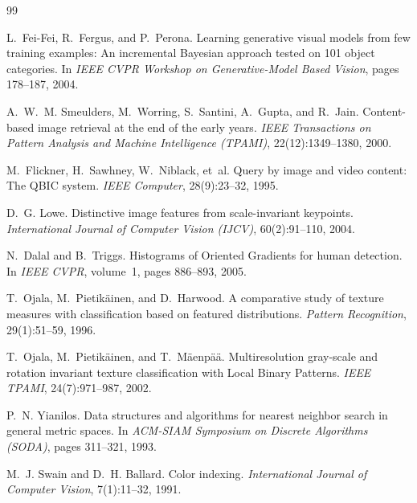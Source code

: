 \documentclass[11pt,a4paper,oneside]{report}
\theoremstyle{definition}
\begin{document}
\newpage
\begin{thebibliography}{99}

L.~Fei-Fei, R.~Fergus, and P.~Perona.
\newblock Learning generative visual models from few training examples: An incremental Bayesian approach tested on 101 object categories.
\newblock In \emph{IEEE CVPR Workshop on Generative-Model Based Vision}, pages 178--187, 2004.

A.~W.~M. Smeulders, M.~Worring, S.~Santini, A.~Gupta, and R.~Jain.
\newblock Content-based image retrieval at the end of the early years.
\newblock \emph{IEEE Transactions on Pattern Analysis and Machine Intelligence (TPAMI)}, 22(12):1349--1380, 2000.

M.~Flickner, H.~Sawhney, W.~Niblack, et~al.
\newblock Query by image and video content: The QBIC system.
\newblock \emph{IEEE Computer}, 28(9):23--32, 1995.

D.~G. Lowe.
\newblock Distinctive image features from scale-invariant keypoints.
\newblock \emph{International Journal of Computer Vision (IJCV)}, 60(2):91--110, 2004.

N.~Dalal and B.~Triggs.
\newblock Histograms of Oriented Gradients for human detection.
\newblock In \emph{IEEE CVPR}, volume~1, pages 886--893, 2005.

T.~Ojala, M.~Pietik{\"a}inen, and D.~Harwood.
\newblock A comparative study of texture measures with classification based on featured distributions.
\newblock \emph{Pattern Recognition}, 29(1):51--59, 1996.

T.~Ojala, M.~Pietik{\"a}inen, and T.~M{\"a}enp{\"a}{\"a}.
\newblock Multiresolution gray-scale and rotation invariant texture classification with Local Binary Patterns.
\newblock \emph{IEEE TPAMI}, 24(7):971--987, 2002.

P.~N. Yianilos.
\newblock Data structures and algorithms for nearest neighbor search in general metric spaces.
\newblock In \emph{ACM-SIAM Symposium on Discrete Algorithms (SODA)}, pages 311--321, 1993.

M.~J. Swain and D.~H. Ballard.
\newblock Color indexing.
\newblock \emph{International Journal of Computer Vision}, 7(1):11--32, 1991.


\end{thebibliography}
\end{document}
